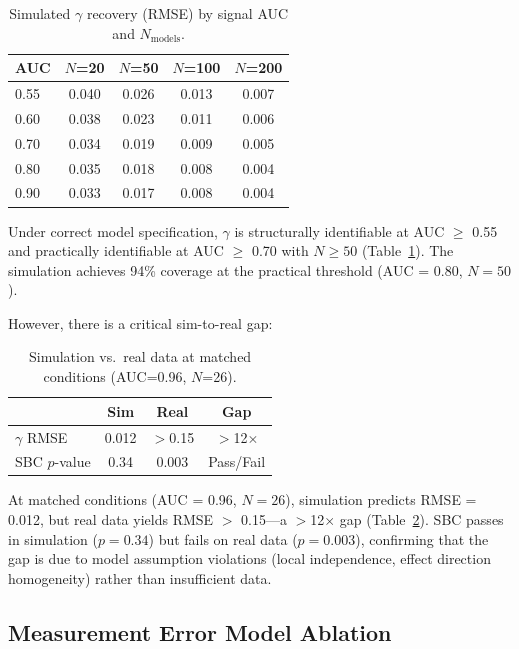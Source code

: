 \documentclass[11pt,a4paper]{article}
\begin{document}
\begin{table}[h]
\centering
\caption{Simulated $\gamma$ recovery (RMSE) by signal AUC and $N_{\text{models}}$.}
\label{tab:sim}
\begin{tabular}{lcccc}
\toprule
AUC & $N$=20 & $N$=50 & $N$=100 & $N$=200 \\
\midrule
0.55 & 0.040 & 0.026 & 0.013 & 0.007 \\
0.60 & 0.038 & 0.023 & 0.011 & 0.006 \\
0.70 & 0.034 & 0.019 & 0.009 & 0.005 \\
0.80 & 0.035 & 0.018 & 0.008 & 0.004 \\
0.90 & 0.033 & 0.017 & 0.008 & 0.004 \\
\bottomrule
\end{tabular}
\end{table}

Under correct model specification, $\gamma$ is structurally identifiable at AUC $\geq$ 0.55 and practically identifiable at AUC $\geq$ 0.70 with $N \geq 50$ (Table~\ref{tab:sim}).
The simulation achieves 94\% coverage at the practical threshold (AUC = 0.80, $N = 50$).

However, there is a critical sim-to-real gap:

\begin{table}[h]
\centering
\caption{Simulation vs.\ real data at matched conditions (AUC=0.96, $N$=26).}
\label{tab:gap}
\begin{tabular}{lccc}
\toprule
& Sim & Real & Gap \\
\midrule
$\gamma$ RMSE & 0.012 & $>$0.15 & $>$12$\times$ \\
SBC $p$-value & 0.34 & 0.003 & Pass/Fail \\
\bottomrule
\end{tabular}
\end{table}

At matched conditions (AUC = 0.96, $N = 26$), simulation predicts RMSE = 0.012, but real data yields RMSE $>$ 0.15---a $>$12$\times$ gap (Table~\ref{tab:gap}).
SBC passes in simulation ($p = 0.34$) but fails on real data ($p = 0.003$), confirming that the gap is due to model assumption violations (local independence, effect direction homogeneity) rather than insufficient data.

\subsection{Measurement Error Model Ablation}
\label{sec:me}
\end{document}
